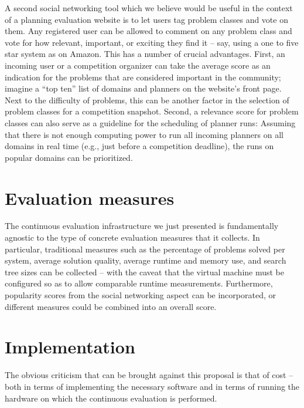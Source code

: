 A second social networking tool which we believe would be useful in
the context of a planning evaluation website is to let users tag
problem classes and vote on them.  Any registered user can be allowed
to comment on any problem class and vote for how relevant, important,
or exciting they find it -- say, using a one to five star system as on
Amazon.  This has a number of crucial advantages.  First, an incoming
user or a competition organizer can take the average score as an
indication for the problems that are considered important in the
community; imagine a ``top ten'' list of domains and planners on the
website's front page.  Next to the difficulty of problems, this can be
another factor in the selection of problem classes for a competition
snapshot.  Second, a relevance score for problem classes can also
serve as a guideline for the scheduling of planner runs: Assuming that
there is not enough computing power to run all incoming planners on
all domains in real time (e.g., just before a competition deadline),
the runs on popular domains can be prioritized.






\section{Evaluation measures}

The continuous evaluation infrastructure we just presented is
fundamentally agnostic to the type of concrete evaluation measures
that it collects.  In particular, traditional measures such as the
percentage of problems solved per system, average solution quality,
average runtime and memory use, and search tree sizes can be
collected -- with the caveat that the virtual machine must be
configured so as to allow comparable runtime measurements.
Furthermore, popularity scores from the social networking aspect can
be incorporated, or different measures could be combined into an
overall score.



\section{Implementation}

The obvious criticism that can be brought against this proposal is
that of cost -- both in terms of implementing the necessary software
and in terms of running the hardware on which the continuous
evaluation is performed.

